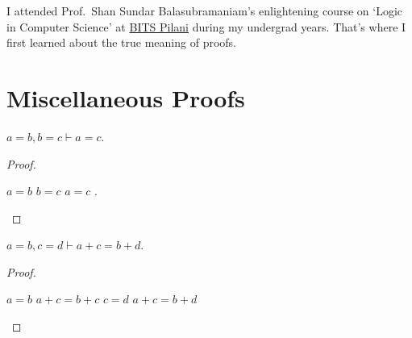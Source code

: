 I attended Prof.~Shan Sundar Balasubramaniam's enlightening course on
`Logic in Computer Science' at \href{https://www.bits-pilani.ac.in}{BITS Pilani}
during my undergrad years.
That's where I first learned about the true meaning of proofs.

%
%

\appendix

\section{Miscellaneous Proofs}
\label{sec:misc-proofs}

\begin{lemma}[\texttt{trn=}]
\label{thm:trn-eq}
$a = b, b = c \vdash a = c$.
\end{lemma}
\begin{proof}\leavevmode

\begin{formalproof}
\State \label{p:trn-eq:1a}$a = b$
\State \label{p:trn-eq:1b}$b = c$
\State \label{p:trn-eq:2}$a = c$
    .
\end{formalproof}

\end{proof}

\begin{lemma}[\texttt{add=}]
\label{thm:add-eq}
$a = b, c = d \vdash a + c = b + d$.
\end{lemma}
\begin{proof}\leavevmode

\begin{formalproof}
\State \label{p:add-eq:1a}$a = b$
\State \label{p:add-eq:2}$a + c = b + c$
\State \label{p:add-eq:1b}$c = d$
\State \label{p:add-eq:3}$a + c = b + d$
\end{formalproof}

\end{proof}

